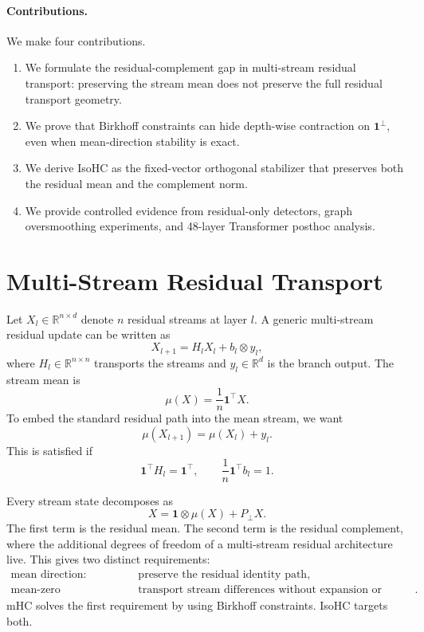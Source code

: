 \documentclass[10pt]{article}
\newcommand{\one}{\mathbf{1}}
\newcommand{\R}{\mathbb{R}}
\newcommand{\pperp}{P_{\perp}}
\newcommand{\operp}{\one^{\perp}}
\begin{document}
\paragraph{Contributions.}
We make four contributions.
\begin{enumerate}
    \item We formulate the residual-complement gap in multi-stream residual
    transport: preserving the stream mean does not preserve the full residual
    transport geometry.
    \item We prove that Birkhoff constraints can hide depth-wise contraction on
    $\operp$, even when mean-direction stability is exact.
    \item We derive IsoHC as the fixed-vector orthogonal stabilizer that
    preserves both the residual mean and the complement norm.
    \item We provide controlled evidence from residual-only detectors, graph
    oversmoothing experiments, and 48-layer Transformer posthoc analysis.
\end{enumerate}

\section{Multi-Stream Residual Transport}

Let $X_l\in\R^{n\times d}$ denote $n$ residual streams at layer $l$.  A generic
multi-stream residual update can be written as
\begin{equation}
    X_{l+1}=H_lX_l+b_l\otimes y_l,
\end{equation}
where $H_l\in\R^{n\times n}$ transports the streams and $y_l\in\R^d$ is the
branch output.  The stream mean is
\begin{equation}
    \mu(X)=\frac{1}{n}\one^\top X.
\end{equation}
To embed the standard residual path into the mean stream, we want
\begin{equation}
    \mu(X_{l+1})=\mu(X_l)+y_l.
\end{equation}
This is satisfied if
\begin{equation}
    \one^\top H_l=\one^\top,\qquad \frac{1}{n}\one^\top b_l=1.
\end{equation}

Every stream state decomposes as
\begin{equation}
    X=\one\otimes\mu(X)+\pperp X.
\end{equation}
The first term is the residual mean.  The second term is the residual
complement, where the additional degrees of freedom of a multi-stream residual
architecture live.  This gives two distinct requirements:
\begin{align}
    \text{mean direction:} &\quad \text{preserve the residual identity path},\\
    \text{mean-zero complement:} &\quad \text{transport stream differences without
    expansion or dissipation}.
\end{align}
mHC solves the first requirement by using Birkhoff constraints.  IsoHC targets
both.
\end{document}

